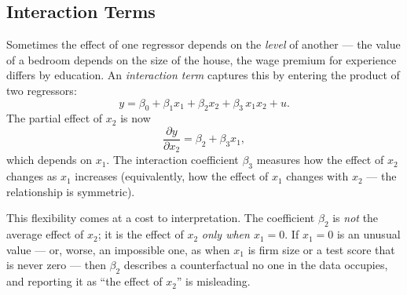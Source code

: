
\subsection{Interaction Terms}

Sometimes the effect of one regressor depends on the \emph{level} of another --- the value of a bedroom depends on the size of the house, the wage premium for experience differs by education. An \emph{interaction term} captures this by entering the product of two regressors:
\[
y = \beta_0 + \beta_1 x_1 + \beta_2 x_2 + \beta_3\,x_1 x_2 + u .
\]
The partial effect of $x_2$ is now
\[
\frac{\partial y}{\partial x_2} = \beta_2 + \beta_3 x_1 ,
\]
which depends on $x_1$. The interaction coefficient $\beta_3$ measures how the effect of $x_2$ changes as $x_1$ increases (equivalently, how the effect of $x_1$ changes with $x_2$ --- the relationship is symmetric).

This flexibility comes at a cost to interpretation. The coefficient $\beta_2$ is \emph{not} the average effect of $x_2$; it is the effect of $x_2$ \emph{only when $x_1 = 0$}. If $x_1=0$ is an unusual value --- or, worse, an impossible one, as when $x_1$ is firm size or a test score that is never zero --- then $\beta_2$ describes a counterfactual no one in the data occupies, and reporting it as ``the effect of $x_2$'' is misleading.

